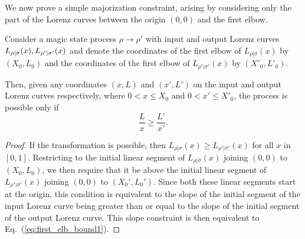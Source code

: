 \documentclass[pra,
aps,
twocolumn,
superscriptaddress,
groupedaddress,
nofootinbib,
reprint
]{revtex4-1}
\begin{document}
We now prove a simple majorization constraint, arising by considering only the part of the Lorenz curves between the origin $(0,0)$ and the first elbow.
\begin{proposition}\label{prop:first_elb}
	Consider a magic state process $\rho \longrightarrow \rho'$ with input and output Lorenz curves ${L_{\rho|\sigma}}(x), {L_{\rho'|\sigma'}}(x)$ and denote the coordinates of the first elbow of $L_{\rho|\sigma}(x)$ by $(X_0, L_0)$ and the coordinates of the first elbow of $L_{\rho' |\sigma'}(x)$ by $(X'_0, L'_0)$.
	
Then, given any coordinates $(x, L)$ and $(x', L')$ on the input and output Lorenz curves respectively, where $0 < x \leq X_0$ and $0 < x' \leq X'_0$, the process is possible only if
\begin{equation}\label{eq:first_elb_bound1}
	\frac{L}{x} \geq \frac{L'}{x'}.
\end{equation}
\end{proposition}
\begin{proof} 
	If the transformation is possible, then $L_{\rho|\sigma}(x) \geq L_{\rho'|\sigma'} (x)$ for all $x$ in $[0,1]$. 
	Restricting to the initial linear segment of $L_{\rho|\sigma}(x)$ joining $(0,0)$ to $(X_0,L_0)$, we then require that it be above the initial linear segment of $L_{\rho'|\sigma'}(x)$ joining $(0,0)$ to $(X_0', L_0')$. 
	Since both these linear segments start at the origin, this condition is equivalent to the slope of the initial segment of the input Lorenz curve being greater than or equal to the slope of the initial segment of the output Lorenz curve. 
	This slope constraint is then equivalent to Eq.~(\ref{eq:first_elb_bound1}). \end{proof}
\end{document}
